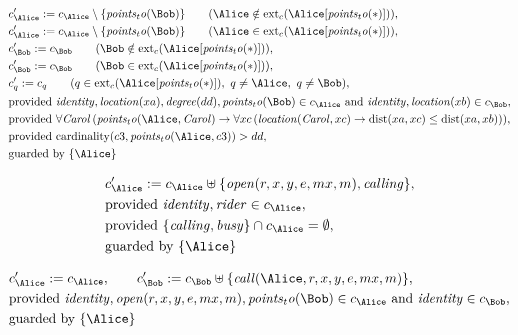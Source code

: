 \begin{align*}
&
c'_
{
\Alice
}
 := 
c_
{
\Alice
}
 \setminus 
\{
\mathit{
points_to
}
(
\Bob
)
\}
 \qquad (
\Alice
 \notin 
\mathrm{ext}_c(
\Alice
[
\mathit{
points_to
}
(
\ast
)
]
)
)
,\\
&
c'_
{
\Alice
}
 := 
c_
{
\Alice
}
 \setminus 
\{
\mathit{
points_to
}
(
\Bob
)
\}
 \qquad (
\Alice
 \in 
\mathrm{ext}_c(
\Alice
[
\mathit{
points_to
}
(
\ast
)
]
)
)
,\\
&
c'_
{
\Bob
}
 := 
c_
{
\Bob
}
 \qquad (
\Bob
 \notin 
\mathrm{ext}_c(
\Alice
[
\mathit{
points_to
}
(
\ast
)
]
)
)
,\\
&
c'_
{
\Bob
}
 := 
c_
{
\Bob
}
 \qquad (
\Bob
 \in 
\mathrm{ext}_c(
\Alice
[
\mathit{
points_to
}
(
\ast
)
]
)
)
,\\
&
c'_
q
 := 
c_
q
 \qquad (
q
 \in 
\mathrm{ext}_c(
\Alice
[
\mathit{
points_to
}
(
\ast
)
]
)
,\ 
q \neq 
\Alice
,\ 
q \neq 
\Bob
)
,\\
&
\text{provided } 
\mathit{
identity
}
,
\mathit{
location
}
(
xa
)
,
\mathit{
degree
}
(
dd
)
,
\mathit{
points_to
}
(
\Bob
)
 \in c_
{
\Alice
}
 \text{ and } 
\mathit{
identity
}
,
\mathit{
location
}
(
xb
)
 \in c_
{
\Bob
}
,\\
&
\text{provided } 
\forall 
\mathit{Carol}
\,(
\mathit{
points_to
}
(
\Alice
,
\mathit{Carol}
)
\rightarrow
\forall 
xc
\,(
\mathit{
location
}
(
\mathit{Carol}
,
xc
)
\rightarrow
\mathrm{
dist
}(
xa
,
xc
)
\le
\mathrm{
dist
}(
xa
,
xb
)
)
)
,\\
&
\text{provided } 
\mathrm{cardinality}(
c3
,
\mathit{
points_to
}
(
\Alice
,
c3
)
)
>
dd
,\\
&
\text{guarded by } \{
\Alice
\}
\end{align*}

\begin{align*}
&
c'_
{
\Alice
}
 := 
c_
{
\Alice
}
 \uplus 
\{
\mathit{
open
}
(
r
,
x
,
y
,
e
,
mx
,
m
)
,
\mathit{
calling
}
\}
,\\
&
\text{provided } 
\mathit{
identity
}
,
\mathit{
rider
}
 \in c_
{
\Alice
}
,\\
&
\text{provided } 
\{
\mathit{
calling
}
,
\mathit{
busy
}
\}
 \cap c_
{
\Alice
}
 = \emptyset
,\\
&
\text{guarded by } \{
\Alice
\}
\end{align*}

\begin{align*}
&
c'_
{
\Alice
}
 := 
c_
{
\Alice
}
, \qquad 
c'_
{
\Bob
}
 := 
c_
{
\Bob
}
 \uplus 
\{
\mathit{
call
}
(
\Alice
,
r
,
x
,
y
,
e
,
mx
,
m
)
\}
,\\
&
\text{provided } 
\mathit{
identity
}
,
\mathit{
open
}
(
r
,
x
,
y
,
e
,
mx
,
m
)
,
\mathit{
points_to
}
(
\Bob
)
 \in c_
{
\Alice
}
 \text{ and } 
\mathit{
identity
}
 \in c_
{
\Bob
}
,\\
&
\text{guarded by } \{
\Alice
\}
\end{align*}
